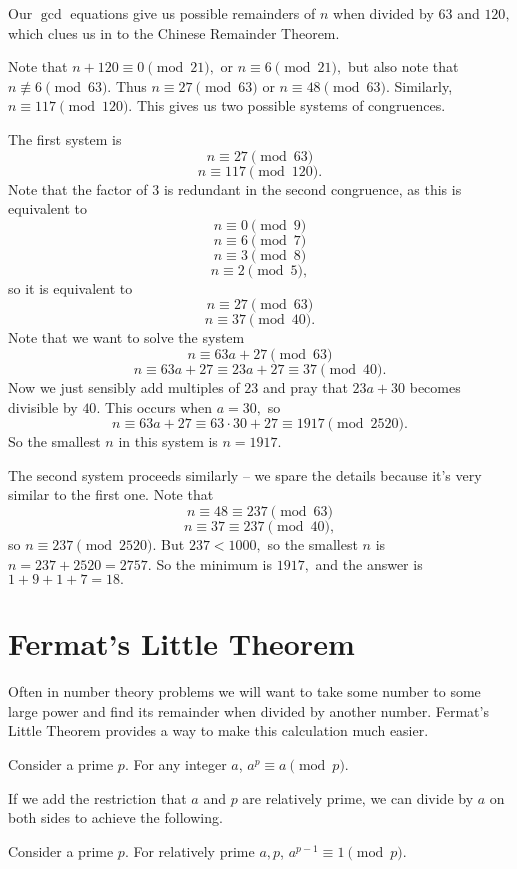 \documentclass[mast]{lucky}
\begin{document}
\begin{sol}
Our $\gcd$ equations give us possible remainders of $n$ when divided by $63$ and $120,$ which clues us in to the Chinese Remainder Theorem.

Note that $n+120\equiv 0\pmod{21},$ or $n\equiv 6\pmod{21},$ but also note that $n\not\equiv 6\pmod{63}.$ Thus $n\equiv 27\pmod{63}$ or $n\equiv 48\pmod{63}.$ Similarly, $n\equiv 117\pmod{120}.$ This gives us two possible systems of congruences.

The first system is
\[n\equiv 27\pmod{63}\]
\[n\equiv 117\pmod{120}.\]
Note that the factor of $3$ is redundant in the second congruence, as this is equivalent to
\[n\equiv 0\pmod{9}\]
\[n\equiv 6\pmod{7}\]
\[n\equiv 3\pmod{8}\]
\[n\equiv 2\pmod{5},\]
so it is equivalent to
\[n\equiv 27\pmod{63}\]
\[n\equiv 37\pmod{40}.\]
Note that we want to solve the system
\[n\equiv 63a+27\pmod{63}\]
\[n\equiv 63a+27\equiv 23a+27\equiv 37\pmod{40}.\]
Now we just sensibly add multiples of $23$ and pray that $23a+30$ becomes divisible by $40.$ This occurs when $a=30,$ so
\[n\equiv 63a+27\equiv 63\cdot 30+27\equiv 1917\pmod{2520}.\]
So the smallest $n$ in this system is $n=1917.$

The second system proceeds similarly -- we spare the details because it's very similar to the first one. Note that
\[n\equiv 48\equiv 237\pmod{63}\]
\[n\equiv 37\equiv 237\pmod{40},\]
so $n\equiv 237\pmod{2520}.$
But $237<1000,$ so the smallest $n$ is $n=237+2520=2757.$ So the minimum is $1917,$ and the answer is $1+9+1+7=18.$
\end{sol}

\section{Fermat's Little Theorem}

Often in number theory problems we will want to take some number to some large power and find its remainder when divided by another number. Fermat's Little Theorem provides a way to make this calculation much easier.

\begin{theo}
Consider a prime $p.$ For any integer $a$, $a^{p}\equiv a \pmod {p}.$
\end{theo}

If we add the restriction that $a$ and $p$ are relatively prime, we can divide by $a$ on both sides to achieve the following.

\begin{theo}
Consider a prime $p.$ For relatively prime $a, p$, $a^{p-1}\equiv 1 \pmod {p}.$
\end{theo}
\end{document}
